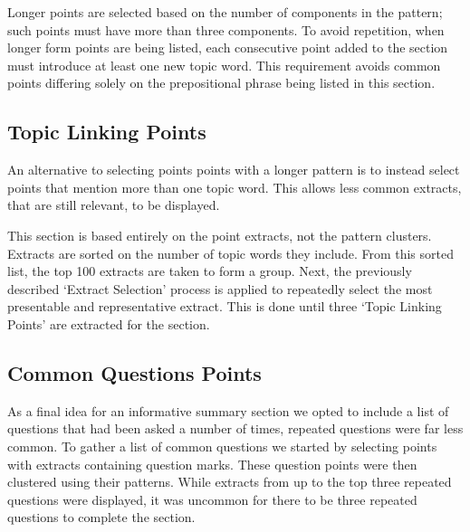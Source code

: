       Longer points are selected based on the number of components in the pattern; such points must have more than three components. To avoid repetition, when longer form points are being listed, each consecutive point added to the section must introduce at least one new topic word. This requirement avoids common points differing solely on the prepositional phrase being listed in this section.

    \subsection{Topic Linking Points}
      An alternative to selecting points points with a longer pattern is to instead select points that mention more than one topic word. This allows less common extracts, that are still relevant, to be displayed.

      This section is based entirely on the point extracts, not the pattern clusters. Extracts are sorted on the number of topic words they include. From this sorted list, the top 100 extracts are taken to form a group. Next, the previously described `Extract Selection' process is applied to repeatedly select the most presentable and representative extract. This is done until three `Topic Linking Points' are extracted for the section.

    \subsection{Common Questions Points}
      As a final idea for an informative summary section we opted to include a list of questions that had been asked a number of times, repeated questions were far less common. To gather a list of common questions we started by selecting points with extracts containing question marks. These question points were then clustered using their patterns. While extracts from up to the top three repeated questions were displayed, it was uncommon for there to be three repeated questions to complete the section.

